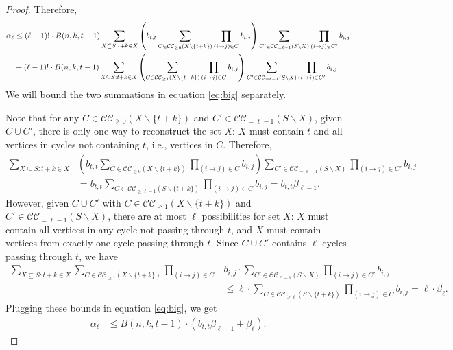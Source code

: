 \documentclass[10pt,a4paper]{amsart}
\begin{document}
\begin{proof}
Therefore, 
\begin{align}
        \alpha_{\ell} 
        &\leq (\ell-1)! \cdot B(n, k, t-1)  \sum_{X \subseteq S: t+k \in X}     \left( b_{t,t} \sum_{C \in \mathcal{CC}_{\geq 0}(X \backslash \{t+k\})} \prod_{(i\rightarrow j) \in C} b_{i,j}\right)  \sum_{C' \in \mathcal{CC}_{=\ell-1}(S \backslash X)} \prod_{(i\rightarrow j) \in C'} b_{i,j} \notag\\
        &+(\ell-1)! \cdot B(n, k, t-1)  \sum_{X \subseteq S: t+k \in X}    \left( \sum_{C \in \mathcal{CC}_{\geq 1}(X\backslash \{t+k\})} \prod_{(i\rightarrow j) \in C} b_{i,j}\right)  \sum_{C' \in \mathcal{CC}_{=\ell-1}(S \backslash X)} \prod_{(i\rightarrow j) \in C'} b_{i,j} . \label{eq:big}
    \end{align}
    We will bound the two summations in equation \eqref{eq:big} separately.
    
    
    Note that for any $C\in \mathcal{CC}_{\geq 0}(X \backslash \{t+k\})$ and $C' \in \mathcal{CC}_{= \ell-1}(S\backslash X)$, given $C \cup C'$, there is only one way to reconstruct the set $X$: $X$ must contain $t$ and all vertices in cycles not containing $t$, i.e., vertices in $C$. Therefore, 
    \begin{align*}
         \sum_{X \subseteq S: t+k \in X}   &\left( b_{t,t} \sum_{C \in \mathcal{CC}_{\geq 0}(X \backslash \{ t+k\})} \prod_{(i\rightarrow j) \in C} b_{i,j}\right)  \sum_{C' \in \mathcal{CC}_{=\ell-1}(S \backslash X)} \prod_{(i\rightarrow j) \in C'} b_{i,j} \\
         &= b_{t,t} \sum_{C\in \mathcal{CC}_{\geq \ell-1}(S \backslash \{t+k\}) } \prod_{(i\rightarrow j) \in C} b_{i,j} = b_{t,t} \beta_{\ell-1}.
    \end{align*}
    However, given $C \cup C'$ with $C\in \mathcal{CC}_{\geq 1}(X \backslash \{t+k\})$ and $C' \in \mathcal{CC}_{= \ell-1}(S\backslash X)$, there are at most $\ell$ possibilities for set $X$: $X$ must contain all vertices in any cycle not passing through $t$, and $X$ must contain vertices from exactly one cycle passing through $t$. Since $C \cup C'$ contains $\ell$ cycles passing through $t$, we have
    \begin{align*}
         \sum_{X \subseteq S: t+k \in X}  \sum_{C \in \mathcal{CC}_{\geq 1}(X \backslash \{t+k\})} \prod_{(i\rightarrow j) \in C}& b_{i,j} \cdot  \sum_{C' \in \mathcal{CC}_{\ell-1}(S \backslash X)} \prod_{(i\rightarrow j) \in C'} b_{i,j} \\
         &\leq \ell\cdot  \sum_{C\in \mathcal{CC}_{\geq \ell}(S \backslash \{t+k\}) } \prod_{(i\rightarrow j) \in C} b_{i,j} 
         = \ell \cdot \beta_{\ell}.
    \end{align*}
    Plugging these bounds in equation \eqref{eq:big}, we get 
    \begin{align*}
        \alpha_{\ell} 
        &\leq B(n, k, t-1) \cdot  \left( b_{t,t} \beta_{\ell-1} + \beta_{\ell}\right).
    \end{align*}
    

\end{proof}
\end{document}
